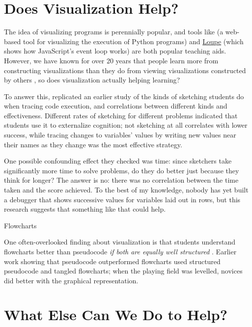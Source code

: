 \section{Does Visualization Help?}\label{s:pck-visualization}

The idea of visualizing programs is perennially popular, and tools
like \cite{Guo2013} (a web-based tool for visualizing the execution of
Python programs) and \href{http://latentflip.com/loupe/}{Loupe} (which
shows how JavaScript's event loop works) are both popular teaching
aids.  However, we have known for over 20 years that people learn more
from constructing visualizations than they do from viewing
visualizations constructed by others \cite{Stas1998,Ceti2016}, so does
visualization actually helping learning?

To answer this, \cite{Cunn2017} replicated an earlier study of the
kinds of sketching students do when tracing code execution, and
correlations between different kinds and effectiveness.  Different
rates of sketching for different problems indicated that students use
it to externalize cognition; not sketching at all correlates with
lower success, while tracing changes to variables' values by writing
new values near their names as they change was the most effective
strategy.

One possible confounding effect they checked was time: since sketchers
take significantly more time to solve problems, do they do better just
because they think for longer?  The answer is no: there was no
correlation between the time taken and the score achieved.  To the
best of my knowledge, nobody has yet built a debugger that shows
successive values for variables laid out in rows, but this research
suggests that something like that could help.

\begin{callout}{Flowcharts}

  One often-overlooked finding about visualization is that students
  understand flowcharts better than pseudocode \emph{if both are
    equally well structured} \cite{Scan1989}.  Earlier work showing
  that pseudocode outperformed flowcharts used structured pseudocode
  and tangled flowcharts; when the playing field was levelled, novices
  did better with the graphical representation.

\end{callout}

\section{What Else Can We Do to Help?}\label{s:pck-help}

